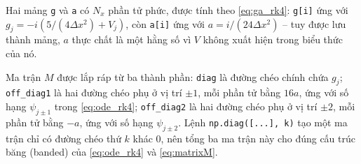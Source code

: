\documentclass[12pt,a4paper]{article}
\begin{document}
Hai mảng \texttt{g} và \texttt{a} có $N_x$ phần tử phức, được tính theo \eqref{eq:ga_rk4}: \texttt{g[i]} ứng với $g_j=-i(5/(4\Delta x^2)+V_j)$, còn \texttt{a[i]} ứng với $a=i/(24\Delta x^2)$ -- tuy được lưu thành mảng, $a$ thực chất là một hằng số vì $V$ không xuất hiện trong biểu thức của nó.

Ma trận $M$ được lắp ráp từ ba thành phần: \texttt{diag} là đường chéo chính chứa $g_j$; \texttt{off\_diag1} là hai đường chéo phụ ở vị trí $\pm1$, mỗi phần tử bằng $16a$, ứng với số hạng $\psi_{j\pm1}$ trong \eqref{eq:ode_rk4}; \texttt{off\_diag2} là hai đường chéo phụ ở vị trí $\pm2$, mỗi phần tử bằng $-a$, ứng với số hạng $\psi_{j\pm2}$. Lệnh \texttt{np.diag([...], k)} tạo một ma trận chỉ có đường chéo thứ $k$ khác 0, nên tổng ba ma trận này cho đúng cấu trúc băng (banded) của \eqref{eq:ode_rk4} và \eqref{eq:matrixM}.
\end{document}
